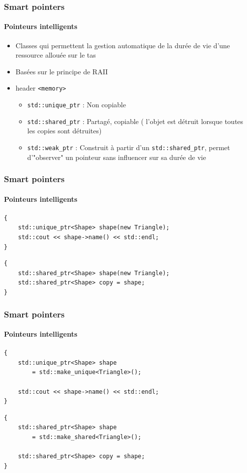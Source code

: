 \documentclass[xetex,mathserif]{beamer}
\begin{document}
\begin{frame}[fragile]
\frametitle{Smart pointers}
\framesubtitle{Pointeurs intelligents}

\begin{itemize}
	\item Classes qui permettent la gestion automatique de la durée de vie d'une ressource allouée sur le tas
	\item Basées sur le principe de RAII
	\item header \lstinline{<memory>}
	\begin{itemize}
		\item \lstinline{std::unique_ptr} : Non copiable
		\item \lstinline{std::shared_ptr} : Partagé, copiable ( l'objet est détruit lorsque toutes les copies  sont détruites)
		\item \lstinline{std::weak_ptr} : Construit à partir d'un \lstinline{std::shared_ptr}, permet d'"observer" un pointeur sans influencer sur sa durée de vie 
	\end{itemize}
\end{itemize}
\end{frame}


\begin{frame}[fragile]
\frametitle{Smart pointers}
\framesubtitle{Pointeurs intelligents}

\begin{lstlisting}
{
    std::unique_ptr<Shape> shape(new Triangle);
    std::cout << shape->name() << std::endl;
}
\end{lstlisting}
\pause
\begin{lstlisting}
{
    std::shared_ptr<Shape> shape(new Triangle);
    std::shared_ptr<Shape> copy = shape;
}
\end{lstlisting}

\end{frame}


\begin{frame}[fragile]
\frametitle{Smart pointers}
\framesubtitle{Pointeurs intelligents}

\begin{lstlisting}
{
    std::unique_ptr<Shape> shape 
        = std::make_unique<Triangle>();
    
    std::cout << shape->name() << std::endl;
}
\end{lstlisting}

\begin{lstlisting}
{
    std::shared_ptr<Shape> shape 
        = std::make_shared<Triangle>();
    
    std::shared_ptr<Shape> copy = shape;
}
\end{lstlisting}
\end{frame}
\end{document}
